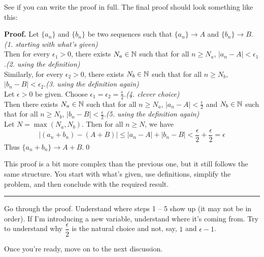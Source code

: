 See if you can write the proof in full. The final proof should look something like this:
\begin{smrg}
\textbf{Proof.} Let $\{a_n\}$ and $\{b_n\}$ be two sequences such that $\{a_n\} \rightarrow A$ and $\{b_n\} \rightarrow B$.\hfill{\footnotesize\itshape(1. starting with what's given)}\\
Then for every $\epsilon_1 > 0$, there exists $N_a \in \mathbb{N}$ such that for all $n \geq N_a$, $|a_n - A| < \epsilon_1$.\hfill{\footnotesize\itshape(2. using the definition)}\\
Similarly, for every $\epsilon_2 > 0$, there exists $N_b \in \mathbb{N}$ such that for all $n \geq N_b$, $|b_n - B| < \epsilon_2$.\hfill{\footnotesize\itshape(3. using the definition again)}\\

Let $\epsilon > 0$ be given. Choose $\epsilon_1 = \epsilon_2 = \frac \epsilon 2$.\hfill{\footnotesize\itshape(4. clever choice)}\\
Then there exists $N_a \in \mathbb{N}$ such that for all $n \geq N_a$, $|a_n - A| < \frac \epsilon 2$ and $N_b \in \mathbb{N}$ such that for all $n \geq N_b$, $|b_n - B| < \frac \epsilon 2$.\hfill{\footnotesize\itshape(5. using the definition again)}\\

Let $N = \max(N_a, N_b)$. Then for all $n \geq N$, we have
$$|(a_n + b_n) - (A + B)| \leq |a_n - A| + |b_n - B| < \frac \epsilon 2 + \frac \epsilon 2 = \epsilon$$
Thus $\{a_n + b_n\} \rightarrow A + B$.\qed
\end{smrg}

This proof is a bit more complex than the previous one, but it still follows the same structure. You start with what's given, use definitions, simplify the problem, and then conclude with the required result.\\

\hrule

Go through the proof. Understand where steps 1 -- 5 show up (it may not be in order). If I'm introducing a new variable, understand where it's coming from. Try to understand why $\dfrac \epsilon 2$ is the natural choice and not, say, $1$ and $\epsilon - 1$.

Once you're ready, move on to the next discussion.
